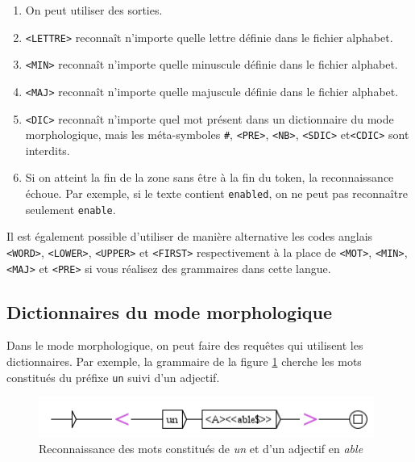 \begin{enumerate}
\item On peut utiliser des sorties.
   
\item \verb+<LETTRE>+ reconnaît n'importe quelle lettre définie dans le fichier alphabet.

\item \verb+<MIN>+ reconnaît n'importe quelle minuscule définie dans le fichier alphabet.

\item \verb+<MAJ>+ reconnaît n'importe quelle majuscule définie dans le fichier alphabet.

\item \verb+<DIC>+ reconnaît n'importe quel mot présent dans un dictionnaire du mode
	 morphologique, mais les méta-symboles \verb+#+, \verb+<PRE>+,  \verb+<NB>+,
 	 \verb+<SDIC>+ et\verb+<CDIC>+ sont interdits.\index{\verbt{\#}}     
\item Si on atteint la fin de la zone sans être à la fin du token, la reconnaissance échoue.
	Par exemple, si le texte contient \verb+enabled+, on ne peut pas reconnaître seulement
	\verb+enable+.
\end{enumerate}

\noindent  Il est également possible d'utiliser de manière alternative  les codes anglais \verb+<WORD>+, \verb+<LOWER>+, \verb+<UPPER>+ et \verb+<FIRST>+
respectivement à la place de \verb+<MOT>+, \verb+<MIN>+, \verb+<MAJ>+ et \verb+<PRE>+ si vous réalisez des grammaires dans cette langue.

\subsection{Dictionnaires du mode morphologique}
\label{dic-mode-morpho}
Dans le mode morphologique, on peut faire des requêtes qui utilisent les dictionnaires.
Par exemple,  la grammaire de la figure \ref{fig-morpho3} cherche les mots constitués du préfixe \verb+un+ suivi d'un adjectif.

\begin{figure}[!ht]
\begin{center}
\includegraphics[width=11cm]{resources/img/fig6-17m.png}
\caption{Reconnaissance des mots constitués de \textit{un} et d'un adjectif en 
\textit{able}\label{fig-morpho3}}
\end{center}
\end{figure}

